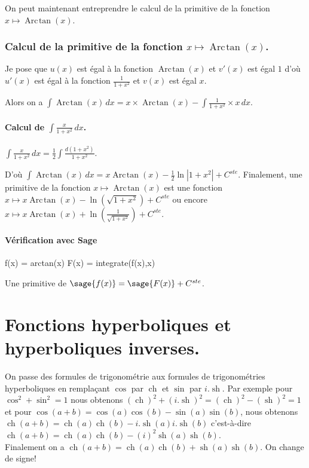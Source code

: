 \documentclass[a4paper,12pt]{report}
\renewcommand{\sinh}{\mathop{\mathrm{sh}}}
\renewcommand{\cosh}{\mathop{\mathrm{ch}}}
\renewcommand{\arctan}{\mathop{\mathrm{Arc\mspace{2mu}tan}}}
\begin{document}
On peut maintenant entreprendre le calcul de la primitive de la  fonction  $x \mapsto \arctan(x) $.


\subsection{Calcul de la primitive de la fonction  $x \mapsto \arctan(x) $.}


Je pose que $u(x)$  est égal à la fonction $\arctan(x)$ et $v'(x)$ est égal $1$  d'où $u'(x)$  est égal à la fonction $ \frac{1}{1+ x^2} $ et $v(x)$ est égal $x$.

Alors on a $\int \arctan(x) \, dx = x \times \arctan(x) -\int \frac{1}{1+x^2} \times x \, dx $.

\subsubsection{Calcul de $\int \frac{x}{1+ x^2} \, dx $.}

$\int \frac{x}{1+ x^2} \, dx = \frac{1}{2} \int \frac{d(1+x^2)}{1+ x^2} $.

D'où $\int \arctan(x) \, dx = x \arctan(x) - \frac{1}{2} \ln \left| 1+ x^2 \right| + C^{ste} $. 
Finalement, une primitive de la fonction $x \mapsto \arctan(x) $ est une fonction $x \mapsto x \arctan(x) -\ln\left( \sqrt{1+ x^2}\right) + C^{ste} $ ou encore $x \mapsto x \arctan(x) +\ln\left( \frac{1}{\sqrt{1+ x^2}}\right) + C^{ste} $.


\subsubsection{Vérification avec Sage}

\begin{sageblock}
    f(x) = arctan(x)
    F(x) = integrate(f(x),x)
\end{sageblock}

Une primitive de $\sage{f(x)} = \sage{F(x)} + C^{ste}$.


\chapter{Fonctions hyperboliques et hyperboliques inverses.}


On passe des formules de trigonométrie aux formules de trigonométries hyperboliques en remplaçant $\cos$ par $\cosh$ et $\sin$ par $i . \sinh$. Par exemple pour $\cos^2+\sin^2=1$
nous obtenons $(\cosh)^2 + (i . \sinh)^2= (\cosh)^2 - (\sinh)^2 = 1$ et pour $\cos(a+b)=\cos(a) \cos(b) - \sin(a) \sin(b) $, nous obtenons $\cosh(a+b)=\cosh(a) \cosh(b) - i .\sinh(a) i . \sinh(b) $ c'est-à-dire $\cosh(a+b)=\cosh(a) \cosh(b) - (i)^2 \sinh(a) \sinh(b) $. \\ Finalement on a $\cosh(a+b) = \cosh(a) \cosh(b) + \sinh(a) \sinh(b) $. On change de signe!
\end{document}
